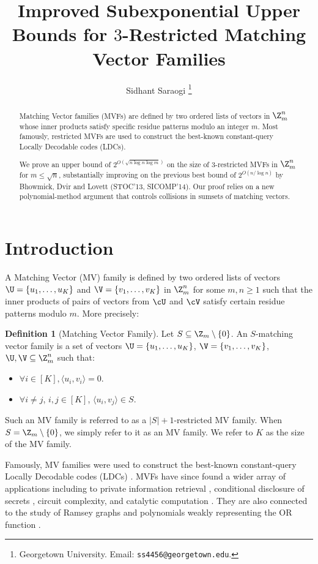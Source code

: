 \documentclass[11pt]{article}
\title{Improved Subexponential Upper Bounds for $3$-Restricted Matching Vector Families}
\author{
 	Sidhant Saraogi%
 	\thanks{Georgetown University. Email: \texttt{ss4456@georgetown.edu}.}
 }
\date{}
\theoremstyle{definition}
\newtheorem{definition}[maintheorem]{Definition}
\begin{document}
\maketitle

\begin{abstract}
Matching Vector families (MVFs) are defined by two ordered lists of vectors in $\Z_m^n$ whose inner products satisfy specific residue patterns modulo an integer $m$. Most famously, restricted MVFs are used to construct the best-known constant-query Locally Decodable codes (LDCs). 

We prove an upper bound of $2^{O\left(\sqrt{n\log n \log m}\right)}$ on the size of $3$-restricted MVFs in $\Z_m^n$ for $m \leq \sqrt{n}$, substantially improving on the previous best bound of $2^{O(n/\log n)}$ by Bhowmick, Dvir and Lovett (STOC'13, SICOMP'14). Our proof relies on a new polynomial-method argument that controls collisions in sumsets of matching vectors. 
\end{abstract}
\section{Introduction}

A Matching Vector (MV) family is defined by two ordered lists of vectors $\U = \{u_1, \dots, u_K\}$ and $\V = \{v_1, \dots, v_K\}$ in $\Z_m^n$ for some $m, n \geq 1$ such that the inner products of pairs of vectors from $\cU$ and $\cV$ satisfy certain residue patterns modulo $m$. More precisely:

\begin{definition}[Matching Vector Family] \label{def:mvf}
Let $S \subseteq \Z_m \setminus \{0\}$. An $S$-matching vector family is a set of vectors $\U = \{u_1, \dots, u_K\}$, $\V = \{v_1, \dots, v_K\}$, $\U, \V \subseteq \Z_m^n$ such that:
\begin{itemize}
    \item $\forall i \in [K], \langle u_i, v_i \rangle = 0$.
    \item $\forall i \neq j$, $i, j \in [K]$, $\langle u_i, v_j \rangle \in S$.
\end{itemize}
\end{definition}

Such an MV family is referred to as a $|S|+1$-restricted MV family. When $S = \Z_m \setminus \{0\}$, we simply refer to it as an MV family. We refer to $K$ as the size of the MV family.  

Famously, MV families were used to construct the best-known constant-query Locally Decodable codes (LDCs) \cite{Yek08, Efr09, dvir2011matching}. MVFs have since found a wider array of applications including to private information retrieval \cite{Yek08, Efr09, GKS24, alon2025}, conditional disclosure of secrets \cite{alon2025}, circuit complexity, and catalytic computation \cite{HPR26}. They are also connected to the study of Ramsey graphs \cite{Grolmusz2000} and polynomials weakly representing the OR function \cite{Grolmusz}.
\end{document}
